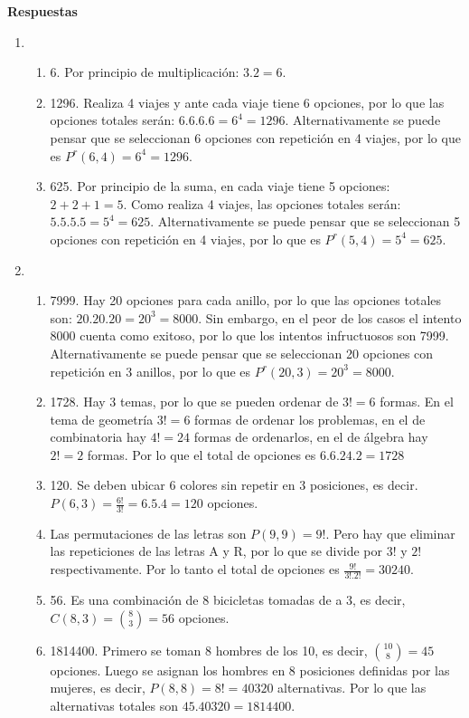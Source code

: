 \documentclass[a4paper]{article}
\newcommand{\exercise}{\item}
\begin{document}
 \textbf{Respuestas}\begin{enumerate}\exercise\begin{enumerate} [label=(\alph*)]		\item 6. Por principio de multiplicación: $3 . 2 = 6$. 
		\item 1296. Realiza 4 viajes y ante cada viaje tiene 6 opciones, por lo que las opciones totales serán: $6.6.6.6 = 6^4 = 1296$. Alternativamente se puede pensar que se seleccionan 6 opciones con repetición en 4 viajes, por lo que es $P^r(6,4)=6^4=1296$.
		\item 625. Por principio de la suma, en cada viaje tiene 5 opciones: $ 2 + 2 + 1 = 5$. Como realiza 4 viajes, las opciones totales serán: $5.5.5.5 = 5^4 = 625$.  Alternativamente se puede pensar que se seleccionan 5 opciones con repetición en 4 viajes, por lo que es $P^r(5,4)=5^4=625$.
\end{enumerate}\exercise\begin{enumerate} [label=(\alph*)]		\item 7999. Hay 20 opciones para cada anillo, por lo que las opciones totales son: $20.20.20 = 20^3 = 8000$. Sin embargo, en el peor de los casos el intento 8000 cuenta como exitoso, por lo que los intentos infructuosos son 7999. Alternativamente se puede pensar que se seleccionan 20 opciones con repetición en 3 anillos, por lo que es $P^r(20,3)=20^3=8000$. 
		\item 1728. Hay 3 temas, por lo que se pueden ordenar de $3! = 6$ formas. En el tema de geometría $3! = 6$ formas de ordenar los problemas, en el de combinatoria hay $4!=24$ formas de ordenarlos, en el de álgebra hay $2!=2$ formas. Por lo que el total de opciones es $6.6.24.2 = 1728$
		\item 120. Se deben ubicar 6 colores sin repetir en 3 posiciones, es decir. $P(6,3)=\frac{6!}{3!}=6.5.4=120$ opciones.
		\item Las permutaciones de las letras son $P(9,9)=9!$. Pero hay que eliminar las repeticiones de las letras A y R, por lo que se divide por $3!$ y $2!$ respectivamente. Por lo tanto el total de opciones es $\frac{9!}{3!.2!}=30240$.
		\item 56. Es una combinación de 8 bicicletas tomadas de a 3, es decir, $C(8,3)=\binom{8}{3}=56$ opciones.
		\item 1814400. Primero se toman 8 hombres de los 10, es decir, $\binom{10}{8}=45$ opciones. Luego se asignan los hombres en 8 posiciones definidas por las mujeres, es decir, $P(8,8)=8!=40320$ alternativas. Por lo que las alternativas totales son $45.40320=1814400$.

\end{enumerate}
\end{enumerate}
\end{document}
